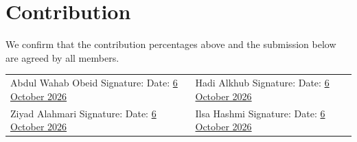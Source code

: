 \documentclass[12pt,a4paper]{article}
\numberwithin{table}{section}
\numberwithin{figure}{section}
\begin{document}
\hypersetup{pageanchor=true}
\onehalfspacing
\renewcommand{\arraystretch}{1.0}

\newpage
{}
{}
\section*{Contribution}
\label{app:contribution}

\begingroup
\renewcommand{\thetable}{\arabic{table}}
\setcounter{table}{0}

\endgroup

\vspace{1.4em}
\noindent
We confirm that the contribution percentages above and the submission below are agreed by all members.

\vspace{1.4em}
\noindent
\begin{tabularx}{\textwidth}{@{}X X@{}}
Abdul Wahab Obeid \newline Signature: \underline{\hspace{4.2cm}} \newline Date: \underline{6 October 2026}
&
Hadi Alkhub \newline Signature: \underline{\hspace{4.2cm}} \newline Date: \underline{6 October 2026} \\[2.2em]
Ziyad Alahmari \newline Signature: \underline{\hspace{4.2cm}} \newline Date: \underline{6 October 2026}
&
Ilsa Hashmi \newline Signature: \underline{\hspace{4.2cm}} \newline Date: \underline{6 October 2026} \\
\end{tabularx}

\newpage
{\singlespacing
\tableofcontents
\par}
\newpage
{\singlespacing
\listoffigures
\par}
\newpage
{\singlespacing
\listoftables
\par}
\newpage




\end{document}
